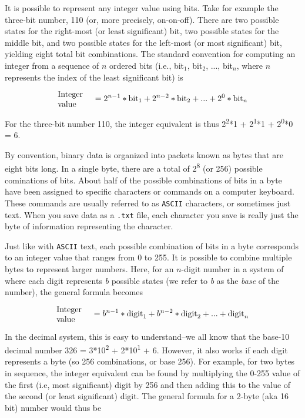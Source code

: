 It is possible to represent any integer value using bits. Take for example the three-bit number, 110 (or, more precisely, on-on-off). There are two possible states for the right-most (or least significant) bit, two possible states for the middle bit, and two possible states for the left-most (or most significant) bit, yielding eight total bit combinations. The standard convention for computing an integer from a sequence of $n$ ordered bits (i.e., bit$_1$, bit$_{2}$, ..., bit$_n$, where $n$ represents the index of the least significant bit) is  

\begin{equation}
\label{eq:base2}
\text{\parbox[c]{1.5cm}{\raggedright Integer value}} = 2^{n-1}*\text{bit}_1 +  2^{n-2}*\text{bit}_{2} + ... + 2^0*\text{bit}_{n}
\end{equation}

For the three-bit number 110, the integer equivalent is thus 2\textsuperscript{2}*1 + 2\textsuperscript{1}*1 + 2\textsuperscript{0}*0 = 6.  

By convention, binary data is organized into packets known as bytes that are eight bits long.  In a single byte, there are a total of 2\textsuperscript{8} (or 256) possible cominations of bits.
About half of the possible combinations of bits in a byte have been assigned to specific characters or commands on a computer keyboard.
These commands are usually referred to as \texttt{ASCII} characters, or sometimes just text.
When you save data as a \texttt{.txt} file, each character you save is really just the byte of information representing the character.

Just like with \texttt{ASCII} text, each possible combination of bits in a byte corresponds to an integer value that ranges from 0 to 255.
It is possible to combine multiple bytes to represent larger numbers.  Here, for an $n$-digit number in a system of where each digit represents \emph{b} possible states (we refer to \emph{b} as the \emph{base} of the number), the general formula becomes

\begin{equation}
\label{eq:base}
\text{\parbox[c]{1.5cm}{\raggedright Integer value}} = b^{n-1}*\text{digit}_1 + b^{n-2}*\text{digit}_{2} + ... + \text{digit}_{n} 
\end{equation}

In the decimal system, this is easy to understand--we all know that the base-10 decimal number 326 = 3*10\textsuperscript{2} + 2*10\textsuperscript{1} + 6.
However, it also works if each digit represents a byte (so 256 combinations, or base 256).  
For example, for two bytes in sequence, the integer equivalent can be found by multiplying the 0-255 value of the first (i.e, most significant) digit by 256 and then adding this to the value of the second (or least significant) digit.
The general formula for a 2-byte (aka 16 bit) number would thus be

